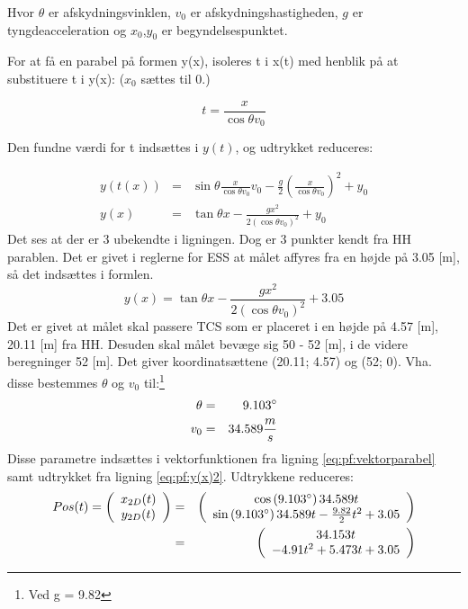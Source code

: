 Hvor $\theta$ er afskydningsvinklen, $v_0$ er afskydningshastigheden, $g$ er tyngdeacceleration og $x_0$,$y_0$ er begyndelsespunktet. 

For at få en parabel på formen y(x), isoleres t i x(t) med henblik på at substituere t i y(x): ($x_0$ sættes til 0.)

\begin{equation}
t = \frac{x}{\cos \theta v_0}
\label{eq:pf:x(t)}
\end{equation}

Den fundne værdi for t indsættes i $y(t)$, og udtrykket reduceres: 

\begin{eqnarray}
y(t(x)) &=& \sin \theta \frac{x}{\cos \theta v_0} v_0 - \frac{g}{2} \left(\frac{x}{\cos \theta v_0}\right)^2 + y_0 \\
y(x) &=& \tan \theta x - \frac{gx^2}{2(\cos \theta v_0)^2} + y_0
\label{eq:pf:y(x(t))}
\end{eqnarray}
Det ses at der er 3 ubekendte i ligningen. Dog er 3 punkter kendt fra HH parablen. Det er givet i reglerne for ESS at målet affyres fra en højde på 3.05 [m], så det indsættes i formlen. 
\begin{equation}
y(x) = \tan \theta x - \frac{gx^2}{2(\cos \theta v_0)^2} + 3.05
\label{eq:pf:y(x)2}
\end{equation}
Det er givet at målet skal passere TCS som er placeret i en højde på 4.57 [m], 20.11 [m] fra HH. 
Desuden skal målet bevæge sig 50 - 52 [m], i de videre beregninger 52 [m]. Det giver koordinatsættene (20.11; 4.57) og (52; 0). Vha. disse bestemmes $\theta$ og $v_0$ til:\footnote{Ved g = 9.82}
\begin{eqnarray}
\theta &=& 9.103 \degree \\
v_0 &=& 34.589 \frac{m}{s}
\end{eqnarray}
Disse parametre indsættes i vektorfunktionen fra ligning \ref{eq:pf:vektorparabel} samt udtrykket fra ligning \ref{eq:pf:y(x)2}. Udtrykkene reduceres: 
\begin{eqnarray}
	Pos(t) = \left( \begin{array}{c}
	x_{2D}(t) \\
	y_{2D}(t)
	\end{array}
	\right)
	&=& \left( \begin{array}{c}
	\cos \left(9.103 \degree \right) 34.589 t \\
	\sin \left(9.103 \degree \right) 34.589 t - \frac{9.82}{2} t^2 + 3.05
	\end{array}
	\right) \\
	&=& \left( \begin{array}{c}
	34.153 t \\
	- 4.91 t^2 + 5.473 t + 3.05
	\end{array}
	\right)
\label{eq:pf:vektorparabel2}
\end{eqnarray}


